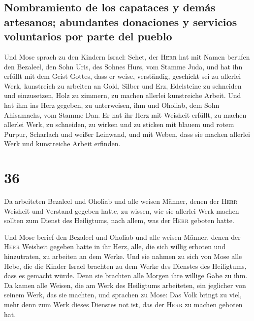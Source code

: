 \hypertarget{nombramiento-de-los-capataces-y-demuxe1s-artesanos-abundantes-donaciones-y-servicios-voluntarios-por-parte-del-pueblo}{%
\subsection{Nombramiento de los capataces y demás artesanos; abundantes
donaciones y servicios voluntarios por parte del
pueblo}\label{nombramiento-de-los-capataces-y-demuxe1s-artesanos-abundantes-donaciones-y-servicios-voluntarios-por-parte-del-pueblo}}

 Und Mose sprach zu den Kindern Israel: Sehet, der
\textsc{Herr} hat mit Namen berufen den Bezaleel, den Sohn Uris, des
Sohnes Hurs, vom Stamme Juda,  und hat ihn erfüllt mit
dem Geist Gottes, dass er weise, verständig, geschickt sei zu allerlei
Werk,  kunstreich zu arbeiten an Gold, Silber und Erz,
 Edelsteine zu schneiden und einzusetzen, Holz zu
zimmern, zu machen allerlei kunstreiche Arbeit.  Und hat
ihm ins Herz gegeben, zu unterweisen, ihm und Oholiab, dem Sohn
Ahisamachs, vom Stamme Dan.  Er hat ihr Herz mit Weisheit
erfüllt, zu machen allerlei Werk, zu schneiden, zu wirken und zu sticken
mit blauem und rotem Purpur, Scharlach und weißer Leinwand, und mit
Weben, dass sie machen allerlei Werk und kunstreiche Arbeit erfinden.

\hypertarget{section-35}{%
\section{36}\label{section-35}}

 Da arbeiteten Bezaleel und Oholiab und alle weisen
Männer, denen der \textsc{Herr} Weisheit und Verstand gegeben hatte, zu
wissen, wie sie allerlei Werk machen sollten zum Dienst des Heiligtums,
nach allem, was der \textsc{Herr} geboten hatte.

 Und Mose berief den Bezaleel und Oholiab und alle weisen
Männer, denen der \textsc{Herr} Weisheit gegeben hatte in ihr Herz,
alle, die sich willig erboten und hinzutraten, zu arbeiten an dem Werke.
 Und sie nahmen zu sich von Mose alle Hebe, die die Kinder
Israel brachten zu dem Werke des Dienstes des Heiligtums, dass es
gemacht würde. Denn sie brachten alle Morgen ihre willige Gabe zu ihm.
 Da kamen alle Weisen, die am Werk des Heiligtums
arbeiteten, ein jeglicher von seinem Werk, das sie machten,
 und sprachen zu Mose: Das Volk bringt zu viel, mehr denn
zum Werk dieses Dienstes not ist, das der \textsc{Herr} zu machen
geboten hat.

